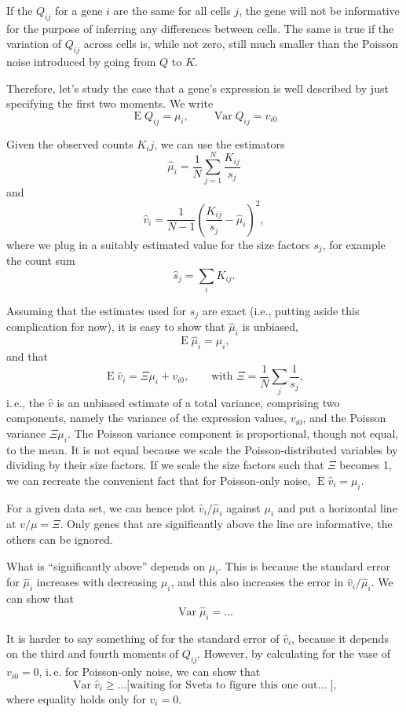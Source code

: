 \documentclass[fleqn]{article}
\begin{document}
If the $Q_{ij}$ for a gene $i$ are the same for all cells $j$, the gene will not be informative for the purpose of inferring any differences between cells. The same is true if the variation of $Q_{ij}$ across cells is, while not zero, still much smaller than the Poisson noise introduced by going
from $Q$ to $K$.

Therefore, let's study the case that a gene's expression is well described by just specifying the first two moments. We write
\[ \operatorname{E} Q_{ij} = \mu_i, \qquad  \operatorname{Var} Q_{ij} = v_{i0} \]

Given the observed counts $K_ij$, we can use the estimators
\[ \hat\mu_i = \frac{1}{N}\sum_{j=1}^N\frac{K_{ij}}{s_j} \]
and
\[ \hat v_i = \frac{1}{N-1} \left( \frac{K_{ij}}{s_j} - \hat\mu_i \right)^2,\]
where we plug in a suitably estimated value for the size factors $s_j$, for example the count sum
\[ \hat s_j = \sum_i K_{ij}.\]

Assuming that the estimates used for $s_j$ are exact (i.e., putting aside this complication for now), it is easy to show
that $\hat\mu_i$ is unbiased,
\[ \operatorname{E} \hat \mu_i = \mu_i, \]
and that 
\[ \operatorname{E} \hat v_i = \Xi \mu_i + v_{i0},\qquad\text{with } \Xi = \frac{1}{N}\sum_j\frac{1}{s_j}, \]
i.\,e., the $\hat v$ is an unbiased estimate of a total variance, comprising two components, namely the
variance of the expression values, $v_{i0}$, and the Poisson variance $\Xi\mu_i$. The Poisson variance
component is proportional, though not equal, to the mean. It is not equal because we scale the Poisson-distributed
variables by dividing by their size factors. If we scale the size factors such that $\Xi$ becomes 1, we can 
recreate the convenient fact that for Poisson-only noise, $\operatorname{E}\hat v_i = \mu_i$.

For a given data set, we can hence plot $\hat v_i/\hat\mu_i$ against $\mu_i$ and put a horizontal line at $v/\mu=\Xi$. Only genes
that are significantly above the line are informative, the others can be ignored.

What is ``significantly above'' depends on $\mu_i$. This is because the standard error for $\hat\mu_i$ increases with decreasing $\mu_i$, and this
also increases the error in $\hat v_i/\hat\mu_i$. We can show that
\[ \operatorname{Var}\hat\mu_i = ... \]

It is harder to say something of for the standard error of $\hat v_i$, because it depends on the third and fourth moments of $Q_{ij}$.
However, by calculating for the vase of $v_{i0} = 0$, i.\,e. for Poisson-only noise, we can show that
\[ \operatorname{Var}\hat v_i \ge ... \text{[waiting for Sveta to figure this one out...  ]}, \]
where equality holds only for $v_i=0$.
\end{document}
